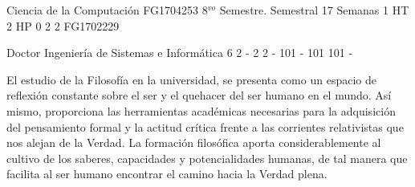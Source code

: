 \documentclass[a4paper,8pt]{article}
\begin{document}
\setNombreProfesor{}
\setGradoProfesorAbreviado{}
\sylabusHeader

\academicaTable
{Ciencia de la Computación} %
{FG1704253} %
{8$^{vo}$ Semestre.} %
{Semestral} %
{17 Semanas} %
{1 HT} %
{2 HP} %
{0} %
{}  %
{2} %
{2} %
{FG1702229} %

\administrativaTable
{Doctor} %
{Ingeniería de Sistemas e Informática} %
{6} %
{2} %
{-} %
{2} %
{2} %
{-} %
{101} %
{-} %
{101} %
{101} %
{-} %


\begin{fundamentacion}
El estudio de la Filosofía en la universidad, se presenta como un espacio de reflexión constante sobre el ser y el quehacer del ser humano en el mundo. Así mismo, proporciona las herramientas académicas necesarias para la adquisición del pensamiento formal y la actitud crítica frente a las corrientes relativistas que nos alejan de la Verdad.
La formación filosófica aporta considerablemente al cultivo de los saberes, capacidades y potencialidades humanas, de tal manera que facilita al ser humano encontrar el camino hacia la Verdad plena.

\end{fundamentacion}

\begin{sumilla}
\item 
\item 
\item 
\item 
\item 

\end{sumilla}

\begin{competenciasAsignatura}
\item {}
\item {}

\end{competenciasAsignatura}
\end{document}
